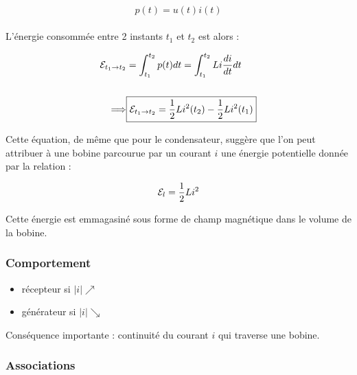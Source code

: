 \documentclass{article}
\begin{document}
\begin{align*}\begin{split}
p(t)=u(t)i(t)
\end{split}\end{align*}

\bigskip

L'énergie consommée entre 2 instants $t_1$ et $t_2$ est alors :

\bigskip

\begin{align*}\begin{split}
\mathcal{E}_{t_1\rightarrow t_2}&=\int_{t_1}^{t_2}p(t)dt = \int_{t_1}^{t_2}Li\frac{di}{dt}dt\\\\
\Longrightarrow& \boxed{\mathcal{E}_{t_1\rightarrow t_2} = \frac{1}{2}Li^2(t_2)-\frac{1}{2}Li^2(t_1)}
\end{split}\end{align*}

Cette équation, de même que pour le condensateur, suggère que l'on peut attribuer à une bobine parcourue par un courant $i$ une énergie potentielle donnée par la relation :

\begin{align*}\begin{split}
\mathcal{E}_l=\frac{1}{2}Li^2
\end{split}\end{align*}

Cette énergie est emmagasiné sous forme de champ magnétique dans le volume de la bobine.

\subsubsection{Comportement}

\begin{itemize}
    \item récepteur si $|i|\nearrow$
    \item générateur si $|i|\searrow$
\end{itemize}

Conséquence importante : continuité du courant $i$ qui traverse une bobine.


\subsubsection{Associations}
\end{document}
